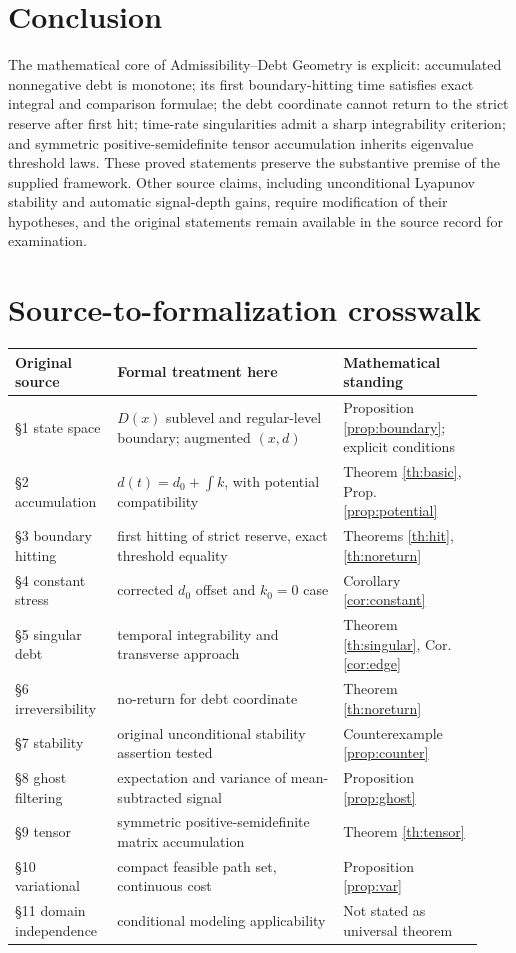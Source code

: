 \documentclass[11pt,letterpaper]{article}
\theoremstyle{definition}\newtheorem{definition}[theorem]{Definition}\newtheorem{example}[theorem]{Example}
\theoremstyle{remark}\newtheorem{remark}[theorem]{Remark}
\begin{document}
\section*{Conclusion}
The mathematical core of Admissibility--Debt Geometry is explicit: accumulated nonnegative debt is monotone; its first boundary-hitting time satisfies exact integral and comparison formulae; the debt coordinate cannot return to the strict reserve after first hit; time-rate singularities admit a sharp integrability criterion; and symmetric positive-semidefinite tensor accumulation inherits eigenvalue threshold laws. These proved statements preserve the substantive premise of the supplied framework. Other source claims, including unconditional Lyapunov stability and automatic signal-depth gains, require modification of their hypotheses, and the original statements remain available in the source record for examination.

\appendix
\section{Source-to-formalization crosswalk}
\small
\begin{longtable}{@{}p{0.19\linewidth}p{0.45\linewidth}p{0.29\linewidth}@{}}
\toprule Original source & Formal treatment here & Mathematical standing\\\midrule\endhead
\S1 state space & $D(x)$ sublevel and regular-level boundary; augmented $(x,d)$ & Proposition \ref{prop:boundary}; explicit conditions\\
\S2 accumulation & $d(t)=d_0+\int k$, with potential compatibility & Theorem \ref{th:basic}, Prop. \ref{prop:potential}\\
\S3 boundary hitting & first hitting of strict reserve, exact threshold equality & Theorems \ref{th:hit}, \ref{th:noreturn}\\
\S4 constant stress & corrected $d_0$ offset and $k_0=0$ case & Corollary \ref{cor:constant}\\
\S5 singular debt & temporal integrability and transverse approach & Theorem \ref{th:singular}, Cor. \ref{cor:edge}\\
\S6 irreversibility & no-return for debt coordinate & Theorem \ref{th:noreturn}\\
\S7 stability & original unconditional stability assertion tested & Counterexample \ref{prop:counter}\\
\S8 ghost filtering & expectation and variance of mean-subtracted signal & Proposition \ref{prop:ghost}\\
\S9 tensor & symmetric positive-semidefinite matrix accumulation & Theorem \ref{th:tensor}\\
\S10 variational & compact feasible path set, continuous cost & Proposition \ref{prop:var}\\
\S11 domain independence & conditional modeling applicability & Not stated as universal theorem\\
\bottomrule
\end{longtable}
\normalsize
\end{document}
